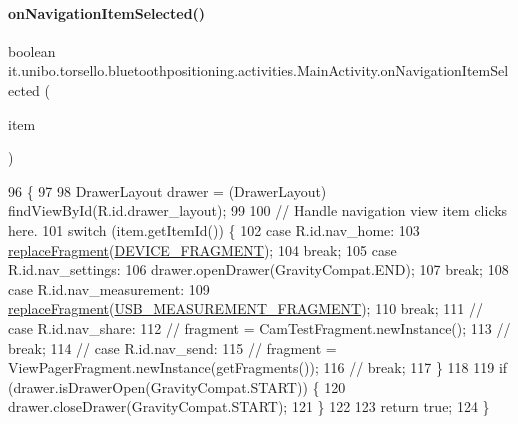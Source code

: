 \paragraph{\texorpdfstring{on\+Navigation\+Item\+Selected()}{onNavigationItemSelected()}}
{\footnotesize\ttfamily boolean it.\+unibo.\+torsello.\+bluetoothpositioning.\+activities.\+Main\+Activity.\+on\+Navigation\+Item\+Selected (\begin{DoxyParamCaption}\item[{Menu\+Item}]{item }\end{DoxyParamCaption})}


\begin{DoxyCode}
96                                                            \{
97 
98         DrawerLayout drawer = (DrawerLayout) findViewById(R.id.drawer\_layout);
99 
100         \textcolor{comment}{// Handle navigation view item clicks here.}
101         \textcolor{keywordflow}{switch} (item.getItemId()) \{
102             \textcolor{keywordflow}{case} R.id.nav\_home:
103                 \hyperlink{classit_1_1unibo_1_1torsello_1_1bluetoothpositioning_1_1activities_1_1MainActivity_a98db4478d28cd91118138d0b652ceb2c_a98db4478d28cd91118138d0b652ceb2c}{replaceFragment}(\hyperlink{classit_1_1unibo_1_1torsello_1_1bluetoothpositioning_1_1activities_1_1MainActivity_a2f77c0245ac2525dc58905e38e1817d1_a2f77c0245ac2525dc58905e38e1817d1}{DEVICE\_FRAGMENT});
104                 \textcolor{keywordflow}{break};
105             \textcolor{keywordflow}{case} R.id.nav\_settings:
106                 drawer.openDrawer(GravityCompat.END);
107                 \textcolor{keywordflow}{break};
108             \textcolor{keywordflow}{case} R.id.nav\_measurement:
109                 \hyperlink{classit_1_1unibo_1_1torsello_1_1bluetoothpositioning_1_1activities_1_1MainActivity_a98db4478d28cd91118138d0b652ceb2c_a98db4478d28cd91118138d0b652ceb2c}{replaceFragment}(\hyperlink{classit_1_1unibo_1_1torsello_1_1bluetoothpositioning_1_1activities_1_1MainActivity_a64bac06e6db556ba1e36c8773e61137b_a64bac06e6db556ba1e36c8773e61137b}{USB\_MEASUREMENT\_FRAGMENT});
110                 \textcolor{keywordflow}{break};
111 \textcolor{comment}{//            case R.id.nav\_share:}
112 \textcolor{comment}{//                fragment = CamTestFragment.newInstance();}
113 \textcolor{comment}{//                break;}
114 \textcolor{comment}{//            case R.id.nav\_send:}
115 \textcolor{comment}{//                fragment = ViewPagerFragment.newInstance(getFragments());}
116 \textcolor{comment}{//                break;}
117         \}
118 
119         \textcolor{keywordflow}{if} (drawer.isDrawerOpen(GravityCompat.START)) \{
120             drawer.closeDrawer(GravityCompat.START);
121         \}
122 
123         \textcolor{keywordflow}{return} \textcolor{keyword}{true};
124     \}
\end{DoxyCode}
